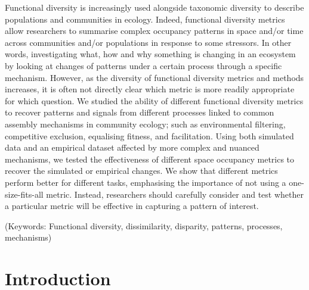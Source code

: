 \documentclass[12pt,letterpaper]{article}
\begin{document}
Functional diversity is increasingly used alongside taxonomic diversity to describe populations and communities in ecology.
Indeed, functional diversity metrics allow researchers to summarise complex occupancy patterns in space and/or time across communities and/or populations in response to some stressors.
In other words, investigating what, how and why something is changing in an ecosystem by looking at changes of patterns under a certain process through a specific mechanism. 
However, as the diversity of functional diversity metrics and methods increases, it is often not directly clear which metric is more readily appropriate for which question.
We studied the ability of different functional diversity metrics to recover patterns and signals from different processes linked to common assembly mechanisms in community ecology; such as environmental filtering, competitive exclusion, equalising fitness, and facilitation.
Using both simulated data and an empirical dataset affected by more complex and nuanced mechanisms, we tested the effectiveness of different space occupancy metrics to recover the simulated or empirical changes.
We show that different metrics perform better for different tasks, emphasising the importance of not using a one-size-fits-all metric.
Instead, researchers should carefully consider and test whether a particular metric will be effective in capturing a pattern of interest.

\noindent (Keywords: Functional diversity, dissimilarity, disparity, patterns, processes, mechanisms)\\

\newpage

\section{Introduction}
\end{document}
